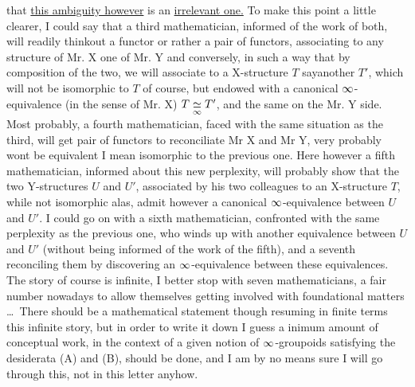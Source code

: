 
that \uline{this ambiguity however} is an \uline{irrelevant one.} To make this point a little clearer, I could say that a third mathematician, informed of the work of both, will readily thinkout a functor or rather a pair of functors, associating to any structure of Mr. X one of Mr. Y and conversely, in such a way that by composition of the two, we will associate to a X-structure \handwritten{(}$T$ say\handwritten{)}another $T'$, which  will not be isomorphic to $T$ of course, but endowed with a canonical  $\infty$-equivalence (in the sense of Mr. X) $T\underset{\infty}{\simeq}T'$, and the same on the Mr. Y side. Most probably, a fourth mathematician, faced with the same situation as the third, will get  pair of functors to reconciliate Mr X and Mr Y,  very probably  wont be equivalent  \handwritten{(}I mean isomorphic\handwritten{)} to the previous one. Here however a fifth mathematician, informed about this new perplexity, will probably show that the two Y-structures $U$ and $U'$, associated by his two colleagues to  an X-structure $T$, while not isomorphic alas, admit however a canonical $\infty$-equivalence between $U$ and $U'$. I could go on with a sixth mathematician, confronted with the same perplexity as the previous one, who winds up with another \inserted{\handwritten{$\infty$}-}equivalence between $U$ and $U'$ (without being informed of the work of the fifth), and a seventh reconciling them by discovering an $\infty$-equivalence between these equivalences. The story of course is infinite, I better stop with seven mathematicians, a fair number nowadays to allow themselves getting involved with foundational matters \ldots\ There should be a mathematical statement though resuming in finite terms this infinite story, but in order to write it down I guess a inimum amount of conceptual work, in the context of a given notion of $\infty$-groupoids satisfying the desiderata (A) and (B), should be done, and I am by no means sure I will go through this, not in this letter anyhow.

